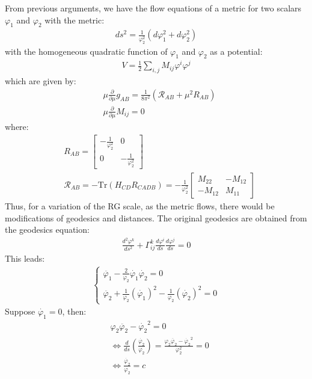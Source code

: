 \documentclass[fleqn]{article}
\begin{document}
From previous arguments, we have the flow equations of a metric for two scalars $\varphi _1$ and $\varphi _2$ with the metric:
\begin{align}
ds^{2} = \frac{1}{\varphi _2 ^{2}} (d\varphi _1 ^{2} + d\varphi_{2} ^{2})
\end{align}
with the homogeneous quadratic function of $\varphi _1$ and $\varphi _2$ as a potential:
\begin{align}
V = \frac{1}{2} \sum_{i,j} M_{ij} \varphi ^{i} \varphi ^{j}
\end{align}
which are given by:
\begin{align}
&\mu \frac{\partial}{\partial \mu} g_{AB} = \frac{1}{8\pi^{2}} (\mathcal{R}_{AB} + \mu ^{2} R_{AB}) \\
&\mu \frac{\partial}{\partial \mu} M_{ij} = 0
\end{align}
where:
\begin{align}
&R_{AB} = \begin{bmatrix}
-\frac{1}{\varphi_{2}^{2}}  & 0 \\
0 & -\frac{1}{\varphi _{2}^{2}}
\end{bmatrix} \\
&\mathcal{R}_{AB} = -\text{Tr} (H_{CD} R_{CADB})  = -\frac{1}{\varphi _{2} ^{2}} \begin{bmatrix}
M_{22} & -M_{12} \\ 
-M_{12} & M_{11} 
\end{bmatrix}
\end{align}
Thus, for a variation of the RG scale, as the metric flows, there would be modifications of geodesics and distances. The original geodesics are obtained from the geodesics equation:
\begin{align}
\frac{d^{2} \varphi ^{k}} {ds^{2}} + \Gamma _{ij} ^{k} \frac{d\varphi ^{i}}{ds} \frac{d\varphi^{j}}{ds} = 0
\end{align}
This leads:
\begin{align}
\begin{cases}
\ddot{\varphi _{1}} - \frac{2}{\varphi _{2}} \dot{\varphi _1} \dot{\varphi _2} = 0 \\
\ddot{\varphi _{2}} + \frac{1}{\varphi _{2}} (\dot{\varphi_{1}})^{2} - \frac{1}{\varphi _{2}} (\dot{\varphi _{2}})^{2} = 0
\end{cases}
\end{align}
Suppose $\dot{\varphi _{1}} = 0$, then:
\begin{align}
&\varphi _{2} \ddot{\varphi _{2}} - \dot{\varphi_{2}} ^{2}= 0 \nonumber \\
&\Leftrightarrow \frac{d}{ds} (\frac{\dot{\varphi _{2}}} {\varphi _{2} })  = \frac{\varphi _{2} \ddot{\varphi _{2}}- \dot{\varphi _{2}} ^{2}} {\varphi _{2} ^{2}}= 0 \nonumber \\
& \Leftrightarrow \frac{\dot{\varphi_{2}}} {\varphi _{2} } = c
\end{align}
\end{document}
